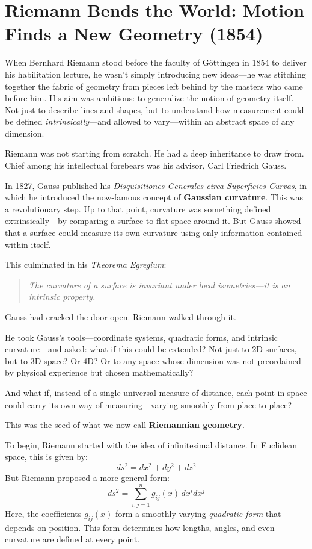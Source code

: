\section{Riemann Bends the World: Motion Finds a New Geometry (1854)}

When Bernhard Riemann stood before the faculty of Göttingen in 1854 to deliver his habilitation lecture, he wasn’t simply introducing new ideas—he was stitching together the fabric of geometry from pieces left behind by the masters who came before him. His aim was ambitious: to generalize the notion of geometry itself. Not just to describe lines and shapes, but to understand how measurement could be defined \emph{intrinsically}—and allowed to vary—within an abstract space of any dimension.

Riemann was not starting from scratch. He had a deep inheritance to draw from. Chief among his intellectual forebears was his advisor, Carl Friedrich Gauss.

In 1827, Gauss published his \textit{Disquisitiones Generales circa Superficies Curvas}, in which he introduced the now-famous concept of \textbf{Gaussian curvature}. This was a revolutionary step. Up to that point, curvature was something defined extrinsically—by comparing a surface to flat space around it. But Gauss showed that a surface could measure its own curvature using only information contained within itself.

This culminated in his \textit{Theorema Egregium}:
\begin{quote}
\textit{The curvature of a surface is invariant under local isometries—it is an intrinsic property.}
\end{quote}

Gauss had cracked the door open. Riemann walked through it.

He took Gauss’s tools—coordinate systems, quadratic forms, and intrinsic curvature—and asked: what if this could be extended? Not just to 2D surfaces, but to 3D space? Or 4D? Or to any space whose dimension was not preordained by physical experience but chosen mathematically?

And what if, instead of a single universal measure of distance, each point in space could carry its own way of measuring—varying smoothly from place to place?

This was the seed of what we now call \textbf{Riemannian geometry}.

To begin, Riemann started with the idea of infinitesimal distance. In Euclidean space, this is given by:
\[
ds^2 = dx^2 + dy^2 + dz^2
\]
But Riemann proposed a more general form:
\[
ds^2 = \sum_{i,j=1}^n g_{ij}(x) \, dx^i dx^j
\]
Here, the coefficients \( g_{ij}(x) \) form a smoothly varying \textit{quadratic form} that depends on position. This form determines how lengths, angles, and even curvature are defined at every point.

